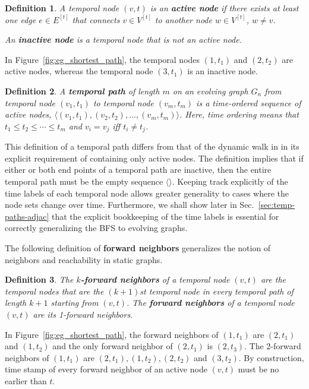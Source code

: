 \documentclass[10pt,conference,compsocconf]{IEEEtran}
\newtheorem{defn}{Definition}
\theoremstyle{definition}
\begin{document}
\begin{defn}
A temporal node $(v,t)$ is an \textbf{active node} if there exists at least one
edge $e\in E^{[t]}$ that connects $v\in V^{[t]}$ to another node $w\in V^{[t]}$,
$w\ne v$.

An \textbf{inactive node} is a temporal node that is not an active node.
\end{defn}

In Figure~\ref{fig:eg_shortest_path}, the temporal nodes $(1,t_1)$ and $(2,t_2)$
are active nodes, whereas the temporal node $(3,t_1)$ is an inactive node.


\begin{defn}
A \textbf{temporal path} of length $m$ on an evolving graph $G_n$
from temporal node $(v_1, t_1)$ to temporal node $(v_m, t_m)$ is
a time-ordered sequence of active nodes,
$\langle (v_1, t_1), (v_2, t_2), \ldots, (v_m, t_m) \rangle$.
Here, time ordering means that $t_1 \leq t_2 \leq \cdots \leq t_m$ and
$v_i = v_j$ iff $t_i \ne t_j$.
\end{defn}

This definition of a temporal path differs from that of the dynamic walk
in \cite{gphe11,grihig13} in its explicit requirement of containing only active
nodes. The definition implies that if either or both end points of a temporal
path are inactive, then the entire temporal path must be the empty sequence
$\langle \rangle$. Keeping track explicitly of the time labels of each temporal
node allows greater generality to cases where the node sets change over time.
Furthermore, we shall show later in Sec.~\ref{sec:temp-paths-adjac}
that the explicit bookkeeping of the time labels is essential for correctly
generalizing the BFS to evolving graphs.


The following definition of \textbf{forward neighbors} generalizes the notion of
neighbors and reachability in static graphs.


\begin{defn}
The \textbf{$k$-forward neighbors} of a temporal node $(v, t)$ are the temporal nodes
that are the $(k+1)$st temporal node in every temporal path of length $k+1$ starting
from $(v, t)$. The \textbf{forward neighbors} of a temporal node $(v, t)$ are its
1-forward neighbors.
\end{defn}

In Figure~\ref{fig:eg_shortest_path},
the forward neighbors of $(1, t_1)$ are $(2, t_1)$ and $(1, t_2)$ and
the only forward neighbor of $(2, t_1)$ is $(2, t_3)$.
The 2-forward neighbors of $(1, t_1)$ are
$(2, t_1), (1, t_2), (2, t_2)$ and $(3, t_2)$.
By construction, time stamp of every forward neighbor of an active node $(v, t)$
must be no earlier than $t$.
\end{document}
